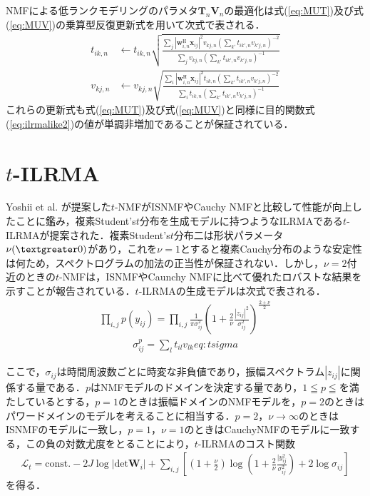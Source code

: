 NMFによる低ランクモデリングのパラメタ$\bm{T}_n\bm{V}_n$の最適化は式(\ref{eq:MUT})及び式(\ref{eq:MUV})の乗算型反復更新式を用いて次式で表される．
\begin{align}
t_{ik, n} &\leftarrow  t_{ik, n} \sqrt{ \frac{ \sum_{j} | \bm{w}_{i,n}^{\mathrm{H}}\bm{x}_{ij} |^2 v_{kj, n} ( \sum_{k'} t_{ik', n} v_{k'j, n} )^{-2} }{ \sum_{j} v_{kj, n} ( \sum_{k'} t_{ik', n} v_{k'j, n} )^{-1} } } \label{eq:t} \\
v_{kj, n} &\leftarrow  v_{kj, n} \sqrt{ \frac{ \sum_{i} | \bm{w}_{i,n}^{\mathrm{H}}\bm{x}_{ij} |^2 t_{ik, n} ( \sum_{k'} t_{ik', n} v_{k'j, n} )^{-2} }{ \sum_{i} t_{ik, n} ( \sum_{k'} t_{ik', n} v_{k'j, n} )^{-1} } } \label{eq:v}
\end{align}
これらの更新式も式(\ref{eq:MUT})及び式(\ref{eq:MUV})と同様に目的関数式(\ref{eq:ilrmalike2})の値が単調非増加であることが保証されている．

\section{$t$-ILRMA}
\label{sec:conv:tilrma}

Yoshii et al. が提案した$t$-NMF\cite{tnmf}がISNMFやCauchy NMF\cite{cauchynmf}と比較して性能が向上したことに鑑み，複素Student's$t$分布を生成モデルに持つようなILRMAである$t$-ILRMAが提案された．複素Student's$t$分布二は形状パラメータ$\nu(\textgreater0)$があり，これを$\nu=1$とすると複素Cauchy分布のような安定性は何ため，スペクトログラムの加法の正当性が保証されない．しかし，$\nu=2$付近のときの$t$-NMFは，ISNMFやCaunchy NMFに比べて優れたロバストな結果を示すことが報告されている．$t$-ILRMAの生成モデルは次式で表される．
\begin{align}
     \prod_{i,j}p\left(y_{ij}\right)= \prod_{i,j} \frac{1}{\pi \sigma_{ij}^{2} } \left( 1+\frac{2}{\nu}\frac{|z_{ij}|^2}{\sigma_{ij}^{2}} \right)^{\frac{2+\nu}{2}}　\label{eq:tmodel}
\end{align}
\begin{align}
     \sigma_{ij}^{p}=\sum_{l}t_{il}v_{lk}{eq:tsigma}
\end{align}

ここで，$\sigma_{ij}$は時間周波数ごとに時変な非負値であり，振幅スペクトラム$|z_{ij}|$に関係する量である．$p$はNMFモデルのドメインを決定する量であり，$1\leqq p \leqq$を満たしているとする，$p=1$のときは振幅ドメインのNMFモデルを，$p=2$のときはパワードメインのモデルを考えることに相当する．$p=2$，$\nu\rightarrow\infty$のときはISNMFのモデルに一致し，$p=1$，$\nu=1$のときはCauchyNMFのモデルに一致する，この負の対数尤度をとることにより，$t$-ILRMAのコスト関数
\begin{align}
    \mathcal{L}_{t} = \mathrm{const.}-2J\log|\mathrm{det}\bm{W}_{i}|+\sum_{i,j}\left\lbrack\left(1+\frac{\nu}{2}\right)\log\left(1+\frac{2}{\nu}\frac{|y_{ij}^{2}}{\sigma_{ij}^{2}}\right)+2\log\sigma_{ij}\right\rbrack \label{eq:tcost}
\end{align}
を得る．

